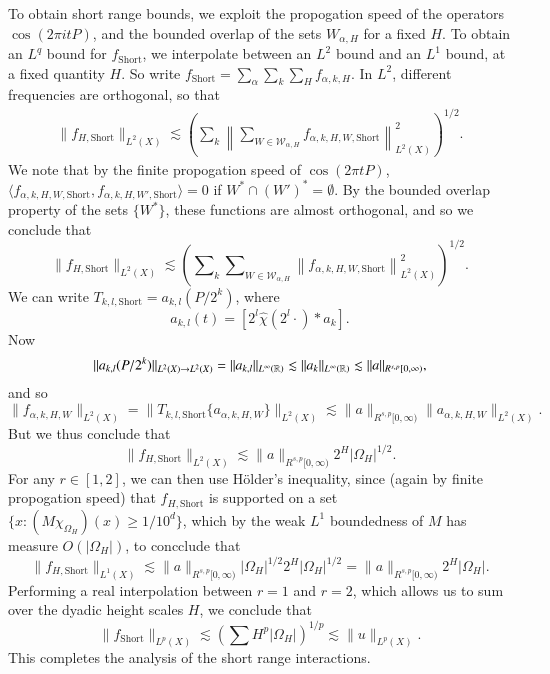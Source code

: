To obtain short range bounds, we exploit the propogation speed of the operators $\cos(2 \pi i t P)$, and the bounded overlap of the sets $W_{\alpha,H}$ for a fixed $H$. To obtain an $L^q$ bound for $f_{\text{Short}}$, we interpolate between an $L^2$ bound and an $L^1$ bound, at a fixed quantity $H$. So write $f_{\text{Short}} = \sum_\alpha \sum_k \sum_H f_{\alpha,k,H}$.
%
In $L^2$, different frequencies are orthogonal, so that
%
\begin{align*}
    \| f_{H,\text{Short}} \|_{L^2(X)} \lesssim \left( \sum\nolimits_k \left\| \sum\nolimits_{W \in \mathcal{W}_{\alpha,H}} f_{\alpha,k,H,W,\text{Short}} \right\|_{L^2(X)}^2 \right)^{1/2}.
\end{align*}
%
We note that by the finite propogation speed of $\cos(2 \pi t P)$, $\langle f_{\alpha,k,H,W,\text{Short}}, f_{\alpha,k,H,W',\text{Short}} \rangle = 0$ if $W^* \cap (W')^* = \emptyset$. By the bounded overlap property of the sets $\{ W^* \}$, these functions are almost orthogonal, and so we conclude that
%
\[ \| f_{H,\text{Short}} \|_{L^2(X)} \lesssim \left( \sum\nolimits_k \sum\nolimits_{W \in \mathcal{W}_{\alpha,H}} \left\| f_{\alpha,k,H,W,\text{Short}} \right\|_{L^2(X)}^2 \right)^{1/2}. \]
%
We can write $T_{k,l,\text{Short}} = a_{k,l}(P / 2^k)$, where
%
\[ a_{k,l}(t) = [2^l \widehat{\chi}(2^l \cdot) * a_k]. \]
%
Now
%
\[ \| a_{k,l}(P/2^k) \|_{L^2(X) \to L^2(X)} = \| a_{k,l} \|_{L^\infty(\operatorname{\mathbb{R}})} \lesssim \| a_k \|_{L^\infty(\operatorname{\mathbb{R}})} \lesssim \| a \|_{R^{s,p}[0,\infty)}, \]
%
and so
%
\[ \| f_{\alpha,k,H,W} \|_{L^2(X)} = \| T_{k,l,\text{Short}} \{ a_{\alpha,k,H,W} \} \|_{L^2(X)} \lesssim \| a \|_{R^{s,p}[0,\infty)} \| a_{\alpha,k,H,W} \|_{L^2(X)}. \]
%
But we thus conclude that
%
\[ \| f_{H,\text{Short}} \|_{L^2(X)} \lesssim \| a \|_{R^{s,p}[0,\infty)} 2^H |\Omega_H|^{1/2}. \]
%
For any $r \in [1,2]$, we can then use H\"{o}lder's inequality, since (again by finite propogation speed) that $f_{H,\text{Short}}$ is supported on a set $\{ x: (M \chi_{\Omega_H})(x) \geq 1/10^d \}$, which by the weak $L^1$ boundedness of $M$ has measure $O(|\Omega_H|)$, to concclude that
%
\[ \| f_{H,\text{Short}} \|_{L^1(X)} \lesssim \| a \|_{R^{s,p}[0,\infty)} |\Omega_H|^{1/2} 2^H |\Omega_H|^{1/2} = \| a \|_{R^{s,p}[0,\infty)} 2^H |\Omega_H|. \]
%
Performing a real interpolation between $r = 1$ and $r = 2$, which allows us to sum over the dyadic height scales $H$, we conclude that
%
\[ \| f_{\text{Short}} \|_{L^p(X)} \lesssim \left( \sum H^p |\Omega_H| \right)^{1/p} \lesssim \| u \|_{L^p(X)}. \]
%
This completes the analysis of the short range interactions.

